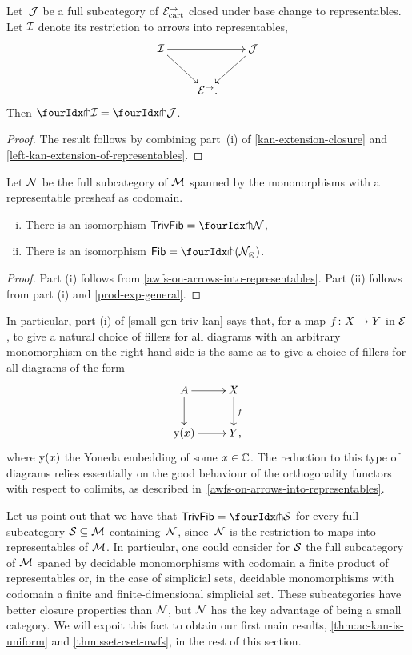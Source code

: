 \documentclass[reqno,10pt,a4paper,oneside,draft]{amsart}
\begin{document}
\begin{proposition} \label{awfs-on-arrows-into-representables}
Let~$\cal{J}$ be a full subcategory of $\catE_{\cart}^\to$ closed under base change to representables.
Let $\cal{I}$ denote its restriction to arrows into representables,
\[
\xymatrix{
  \cal{I}
  \ar[rr]
  \ar[dr]
&&
  \cal{J}
  \ar[dl]
\\&
  \catE^\to
\rlap{.}}
\]
Then $\liftr{\cal{I}} = \liftr{\cal{J}}$.
\end{proposition}

\begin{proof}
The result follows by combining part~(i) of \cref{kan-extension-closure} and \cref{left-kan-extension-of-representables}.
\end{proof}

\begin{theorem} \label{small-gen-triv-kan} Let $\cal{N}$ be the full subcategory of $\cal{M}$ spanned by the mononorphisms with a representable presheaf as codomain.
\begin{enumerate}[(i)]
\item There is an isomorphism $\TrivFib = \liftr{\cal{N}}$,
\item There is an isomorphism $\Fib = \liftr{(\cal{N}_\otimes)}$.
\end{enumerate}
\end{theorem}

\begin{proof} Part (i) follows from \cref{awfs-on-arrows-into-representables}.
Part (ii) follows from part (i) and \cref{prod-exp-general}.
\end{proof}

In particular, part (i) of \cref{small-gen-triv-kan} says that, for a map $f \co X \to Y$ in $\catE$, to give a natural choice of fillers for all diagrams with an arbitrary monomorphism on the right-hand side is the same as to give a choice of fillers for all diagrams of the form
\[
\xymatrix{
A \ar[r] \ar[d] & X \ar[d]^f \\
\yon(x) \ar[r] & Y \rlap{,} }
\]
where $\yon(x)$ the Yoneda embedding of some $x \in \catC$.
The reduction to this type of diagrams relies essentially on the good behaviour of the orthogonality functors with respect to colimits, as described in~\cref{awfs-on-arrows-into-representables}.

\medskip

Let us point out that we have that $\TrivFib = \liftr{\cal{S}}$ for every full subcategory $\cal{S} \subseteq \cal{M}$ containing~$\cal{N}$, since~$\cal{N}$ is the restriction to maps into representables of $\cal{M}$.
In particular, one could consider for
$\cal{S}$ the full subcategory of $\cal{M}$ spaned by decidable monomorphisms with codomain a finite product of representables or, in the case of simplicial sets, decidable monomorphisms with codomain a finite and finite-dimensional simplicial set.
These subcategories have better closure properties than $\cal{N}$, but $\cal{N}$ has the key advantage of being a small category.
We will expoit this fact to obtain our first main results, \cref{thm:ac-kan-is-uniform} and \cref{thm:sset-cset-nwfs}, in the rest of this section.
\end{document}
